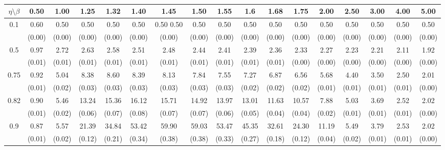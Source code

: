 \documentclass[12pt]{article}  %
\theoremstyle{plain}
\begin{document}
\begin{sidewaystable}[htbp]
\centering
{}
\label{ATS_10-7}
\ \\
\begin{tabular}{ccccccccccccccccc}
\hline
$\eta \setminus \beta $        & 0.50   & 1.00   & 1.25   & 1.32   & 1.40   & 1.45   & 1.50   & 1.55   & 1.6   & 1.68   & 1.75   & 2.00   & 2.50   & 3.00   & 4.00  &5.00 \\ \hline
\multirow{2}{*}{0.1}  & 0.60& 0.50 & 0.50 & 0.50 &  0.50  & 0.50   0.50 &  0.50  & 0.50  & 0.50  &0.50 & 0.50 & 0.50 & 0.50 & 0.50 & 0.50 &0.50\\
                      & (0.00) & (0.00) & (0.00) & (0.00) & (0.00) & (0.00) & (0.00) & (0.00) & (0.00) & (0.00) & (0.00) & (0.00) & (0.00) & (0.00) & (0.00) & (0.00)\\ \hline
\multirow{2}{*}{0.5}  & 0.97 &2.72 & 2.63 & 2.58  & 2.51  & 2.48  & 2.44 &  2.41  & 2.39  & 2.36 & 2.33  &2.27 & 2.23&  2.21  &2.11 & 1.92 \\
                      & (0.01) & (0.01) & (0.01) & (0.01) & (0.01) & (0.01) & (0.01) & (0.01) & (0.01) & (0.01) & (0.00) & (0.00)  & (0.00) & (0.00) & (0.00)&(0.00)\\ \hline
\multirow{2}{*}{0.75}  & 0.92& 5.04 & 8.38 & 8.60  & 8.39 & 8.13  & 7.84  & 7.55 &  7.27 &  6.87&  6.56 & 5.68 & 4.40&  3.50 & 2.50 & 2.01\\
                      & (0.01)& (0.02)& (0.03)& (0.03)& (0.03)& (0.03)& (0.03)& (0.03)& (0.02)&  (0.02)&  (0.02)&  (0.01)&  (0.01)&  (0.01)&  (0.01)   &   (0.00)\\ \hline
\multirow{2}{*}{0.82}  & 0.90& 5.46& 13.24& 15.36 & 16.12 & 15.71 & 14.92 & 13.97 & 13.01 & 11.63& 10.57 & 7.88  &5.03 & 3.69  &2.52 & 2.02\\
                      & (0.01)& (0.02)& (0.06)& (0.07)& (0.08)& (0.07)& (0.07)& (0.06)& (0.05)&  (0.04)&  (0.04)&  (0.02)&  (0.01)&  (0.01)&  (0.01) &   (0.00)\\ \hline
\multirow{2}{*}{0.9}  & 0.87& 5.57 &21.39 &34.84 & 53.42 & 59.90 & 59.03 & 53.47 & 45.35 & 32.61& 24.30& 11.19 & 5.49 & 3.79 & 2.53 & 2.02\\
                      & (0.01)& (0.02)& (0.12)& (0.21)& (0.34)& (0.38)& (0.38)& (0.33)& (0.27)&  (0.18)&  (0.12)&  (0.04)&  (0.02)&  (0.01)&  (0.01) &   (0.00)\\ \hline                                               

\end{tabular}
\end{sidewaystable}
\end{document}
